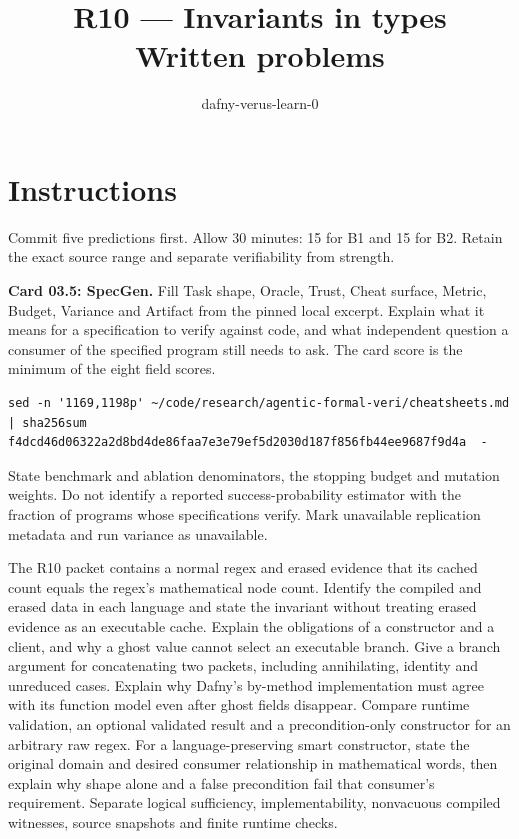 \documentclass[11pt]{article}
\title{R10 --- Invariants in types \\ \large Written problems}
\author{dafny-verus-learn-0}
\date{}
\begin{document}
\maketitle
\section*{Instructions}
Commit five predictions first. Allow 30 minutes: 15 for B1 and 15 for B2.
Retain the exact source range and separate verifiability from strength.
\begin{problem}\label{prob:B1}
\textbf{Card 03.5: SpecGen.} Fill Task shape, Oracle, Trust, Cheat surface,
Metric, Budget, Variance and Artifact from the pinned local excerpt. Explain
what it means for a specification to verify against code, and what independent
question a consumer of the specified program still needs to ask.
The card score is the minimum of the eight field scores.
\begin{verbatim}
sed -n '1169,1198p' ~/code/research/agentic-formal-veri/cheatsheets.md | sha256sum
f4dcd46d06322a2d8bd4de86faa7e3e79ef5d2030d187f856fb44ee9687f9d4a  -
\end{verbatim}
State benchmark and ablation denominators, the stopping budget and mutation
weights. Do not identify a reported success-probability estimator with the
fraction of programs whose specifications verify. Mark unavailable replication
metadata and run variance as unavailable.
\end{problem}
\begin{problem}[proof]\label{prob:B2}
The R10 packet contains a normal regex and erased evidence that its cached
count equals the regex's mathematical node count. Identify the compiled and
erased data in each language and state the invariant without treating erased
evidence as an executable cache. Explain the obligations of a constructor and
a client, and why a ghost value cannot select an executable branch.
Give a branch argument for concatenating two packets, including annihilating,
identity and unreduced cases. Explain why Dafny's by-method implementation must
agree with its function model even after ghost fields disappear.
Compare runtime validation, an optional validated result and a precondition-only
constructor for an arbitrary raw regex. For a language-preserving smart
constructor, state the original domain and desired consumer relationship in
mathematical words, then explain why shape alone and a false precondition fail
that consumer's requirement. Separate logical sufficiency, implementability,
nonvacuous compiled witnesses, source snapshots and finite runtime checks.
\end{problem}
\end{document}
